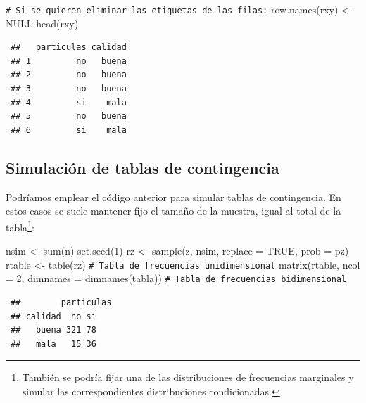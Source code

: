 \documentclass[
]{book}
\newenvironment{Shaded}{\begin{snugshade}}{\end{snugshade}}
\newcommand{\AttributeTok}[1]{\textcolor[rgb]{0.77,0.63,0.00}{#1}}
\newcommand{\CommentTok}[1]{\textcolor[rgb]{0.56,0.35,0.01}{\textit{#1}}}
\newcommand{\ConstantTok}[1]{\textcolor[rgb]{0.00,0.00,0.00}{#1}}
\newcommand{\DecValTok}[1]{\textcolor[rgb]{0.00,0.00,0.81}{#1}}
\newcommand{\FunctionTok}[1]{\textcolor[rgb]{0.00,0.00,0.00}{#1}}
\newcommand{\NormalTok}[1]{#1}
\newcommand{\OtherTok}[1]{\textcolor[rgb]{0.56,0.35,0.01}{#1}}
\theoremstyle{break}
\theoremstyle{nonumberplain}
\renewcommand{\CommentTok}[1]{\textcolor[rgb]{0.41,0.41,0.41}{\texttt{#1}}}
\begin{document}
\begin{Shaded}
\begin{Highlighting}[]
\CommentTok{\# Si se quieren eliminar las etiquetas de las filas:}
\FunctionTok{row.names}\NormalTok{(rxy) }\OtherTok{\textless{}{-}} \ConstantTok{NULL}
\FunctionTok{head}\NormalTok{(rxy)}
\end{Highlighting}
\end{Shaded}

\begin{verbatim}
 ##   particulas calidad
 ## 1         no   buena
 ## 2         no   buena
 ## 3         no   buena
 ## 4         si    mala
 ## 5         no   buena
 ## 6         si    mala
\end{verbatim}

\hypertarget{simconting}{%
\subsection{Simulación de tablas de contingencia}\label{simconting}}

Podríamos emplear el código anterior para simular tablas de contingencia.
En estos casos se suele mantener fijo el tamaño de la muestra, igual al total de la tabla\footnote{También se podría fijar una de las distribuciones de frecuencias marginales y simular las correspondientes distribuciones condicionadas.}:

\begin{Shaded}
\begin{Highlighting}[]
\NormalTok{nsim }\OtherTok{\textless{}{-}} \FunctionTok{sum}\NormalTok{(n)}
\FunctionTok{set.seed}\NormalTok{(}\DecValTok{1}\NormalTok{)}
\NormalTok{rz }\OtherTok{\textless{}{-}} \FunctionTok{sample}\NormalTok{(z, nsim, }\AttributeTok{replace =} \ConstantTok{TRUE}\NormalTok{, }\AttributeTok{prob =}\NormalTok{ pz)}
\NormalTok{rtable }\OtherTok{\textless{}{-}} \FunctionTok{table}\NormalTok{(rz) }\CommentTok{\# Tabla de frecuencias unidimensional}
\FunctionTok{matrix}\NormalTok{(rtable, }\AttributeTok{ncol =} \DecValTok{2}\NormalTok{, }\AttributeTok{dimnames =} \FunctionTok{dimnames}\NormalTok{(tabla)) }\CommentTok{\# Tabla de frecuencias bidimensional}
\end{Highlighting}
\end{Shaded}

\begin{verbatim}
 ##        particulas
 ## calidad  no si
 ##   buena 321 78
 ##   mala   15 36
\end{verbatim}
\end{document}
